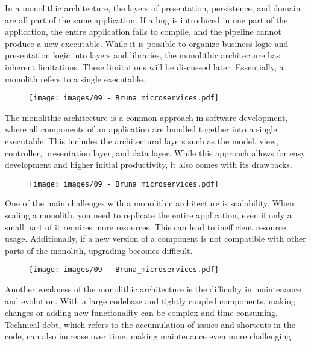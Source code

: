 In a monolithic architecture, the layers of presentation, persistence,
and domain are all part of the same application. If a bug is introduced
in one part of the application, the entire application fails to compile,
and the pipeline cannot produce a new executable. While it is possible
to organize business logic and presentation logic into layers and
libraries, the monolithic architecture has inherent limitations. These
limitations will be discussed later. Essentially, a monolith refers to a
single executable.

\begin{figure}[!h]
  \centering
  \texttt{[image: images/09 - Bruna\_microservices.pdf]}
\end{figure}

The monolithic architecture is a common approach in software
development, where all components of an application are bundled together
into a single executable. This includes the architectural layers such as
the model, view, controller, presentation layer, and data layer. While
this approach allows for easy development and higher initial
productivity, it also comes with its drawbacks.

\begin{figure}[!h]
  \centering
  \texttt{[image: images/09 - Bruna\_microservices.pdf]}
\end{figure}

One of the main challenges with a monolithic architecture is
scalability. When scaling a monolith, you need to replicate the entire
application, even if only a small part of it requires more resources.
This can lead to inefficient resource usage. Additionally, if a new
version of a component is not compatible with other parts of the
monolith, upgrading becomes difficult.

\begin{figure}[!h]
  \centering
  \texttt{[image: images/09 - Bruna\_microservices.pdf]}
\end{figure}

Another weakness of the monolithic architecture is the difficulty in
maintenance and evolution. With a large codebase and tightly coupled
components, making changes or adding new functionality can be complex
and time-consuming. Technical debt, which refers to the accumulation of
issues and shortcuts in the code, can also increase over time, making
maintenance even more challenging.

